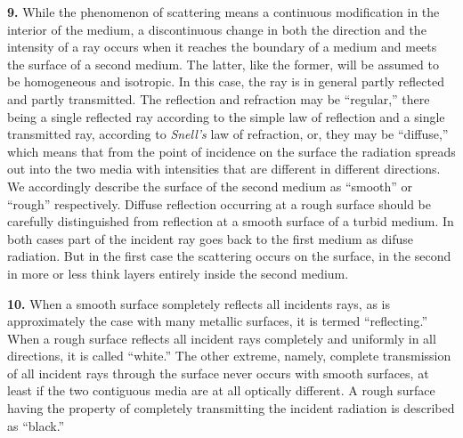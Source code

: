 \documentclass[12pt,oneside]{book}
\begin{document}
\textbf{9.} While the phenomenon of scattering means a continuous modification in the interior of the medium, a discontinuous change in both the direction and the intensity of a ray occurs when it reaches the boundary of a medium and meets the surface of a second medium. The latter, like the former, will be assumed to be homogeneous and isotropic. In this case, the ray is in general partly reflected and partly transmitted. The reflection and refraction may be ``regular,'' there being a single reflected ray according to the simple law of reflection and a single transmitted ray, according to \textit{Snell's} law of refraction, or, they may be ``diffuse,'' which means that from the point of incidence on the surface the radiation spreads out into the two media with intensities that are different in different directions. We accordingly describe the surface of the second medium as ``smooth'' or ``rough'' respectively. Diffuse reflection occurring at a rough surface should be carefully distinguished from reflection at a smooth surface of a turbid medium. In both cases part of the incident ray goes back to the first medium as difuse radiation. But in the first case the scattering occurs on the surface, in the second in more or less think layers entirely inside the second medium. \par

\textbf{10.} When a smooth surface sompletely reflects all incidents rays, as is approximately the case with many metallic surfaces, it is termed ``reflecting.'' When a rough surface reflects all incident rays completely and uniformly in all directions, it is called ``white.'' The other extreme, namely, complete  transmission of all incident rays through the surface never occurs with smooth surfaces, at least if the two contiguous media are at all optically different. A rough surface having the property of completely transmitting the incident radiation is described as ``black.'' \par
\end{document}

